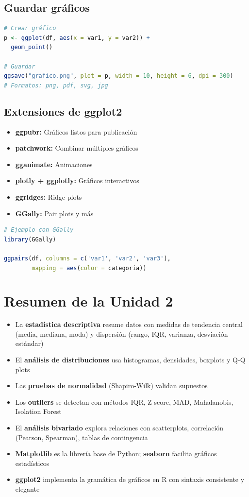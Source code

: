 \documentclass[a4paper,11pt]{article}
\begin{document}
\subsection{Guardar gráficos}

\begin{lstlisting}[language=R]
# Crear gráfico
p <- ggplot(df, aes(x = var1, y = var2)) +
  geom_point()

# Guardar
ggsave("grafico.png", plot = p, width = 10, height = 6, dpi = 300)
# Formatos: png, pdf, svg, jpg
\end{lstlisting}

\subsection{Extensiones de ggplot2}

\begin{itemize}
    \item \textbf{ggpubr:} Gráficos listos para publicación
    \item \textbf{patchwork:} Combinar múltiples gráficos
    \item \textbf{gganimate:} Animaciones
    \item \textbf{plotly + ggplotly:} Gráficos interactivos
    \item \textbf{ggridges:} Ridge plots
    \item \textbf{GGally:} Pair plots y más
\end{itemize}

\begin{lstlisting}[language=R]
# Ejemplo con GGally
library(GGally)

ggpairs(df, columns = c('var1', 'var2', 'var3'), 
        mapping = aes(color = categoria))
\end{lstlisting}

\section*{Resumen de la Unidad 2}

\begin{itemize}[leftmargin=*]
    \item La \textbf{estadística descriptiva} resume datos con medidas de tendencia central (media, mediana, moda) y dispersión (rango, IQR, varianza, desviación estándar)
    \item El \textbf{análisis de distribuciones} usa histogramas, densidades, boxplots y Q-Q plots
    \item Las \textbf{pruebas de normalidad} (Shapiro-Wilk) validan supuestos
    \item Los \textbf{outliers} se detectan con métodos IQR, Z-score, MAD, Mahalanobis, Isolation Forest
    \item El \textbf{análisis bivariado} explora relaciones con scatterplots, correlación (Pearson, Spearman), tablas de contingencia
    \item \textbf{Matplotlib} es la librería base de Python; \textbf{seaborn} facilita gráficos estadísticos
    \item \textbf{ggplot2} implementa la gramática de gráficos en R con sintaxis consistente y elegante
\end{itemize}
\end{document}
